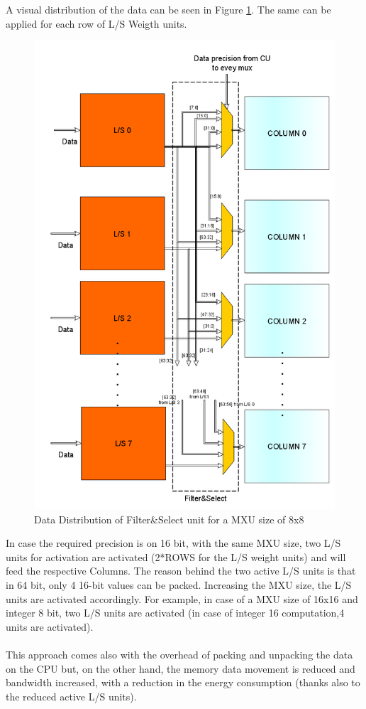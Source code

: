 A visual distribution of the data can be seen in Figure \ref{fig:fscs}. The same can be applied for each row of L/S Weigth units.
\begin{figure}[H]
\centering
\captionsetup{justification=centering}
\includegraphics[scale=0.5,angle=0]{./figure/filter_and_select.png}
\caption{Data Distribution of Filter\&Select unit for a MXU size of 8x8}
\label{fig:fscs}
\end{figure} 


In case the required precision is on 16 bit, with the same MXU size, two L/S units for activation are activated (2*ROWS for the L/S weight units) and will feed the respective Columns. The reason behind the two active L/S units is that in 64 bit, only 4 16-bit values can be packed.
Increasing the MXU size, the L/S units are activated accordingly. For example, in case of a MXU size of 16x16 and integer 8 bit, two L/S units are activated (in case of integer 16 computation,4 units are activated).
\\\\
This approach comes also with the overhead of packing and unpacking the data on the CPU but, on the other hand, the memory data movement is reduced and bandwidth increased, with a reduction in the energy consumption (thanks also to the reduced active L/S units).


